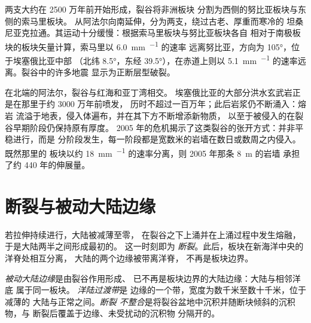 两支大约在 2500 万年前开始形成，裂谷将非洲板块
分割为西侧的努比亚板块与东侧的索马里板块。
从阿法尔向南延伸，分为两支，绕过古老、厚重而寒冷的
坦桑尼亚克拉通。其运动十分缓慢：根据索马里板块与努比亚板块各自
相对于南极板块的板块矢量计算，索马里以 \qty{6.0}{mm.^{-1}} 的速率
远离努比亚，方向为 \ang{105}，位于埃塞俄比亚中部
（北纬 \ang{8.5}，东经 \ang{39.5}），在赤道上则以
\qty{5.1}{mm.^{-1}} 的速率远离。裂谷中的许多地震
显示为正断层型破裂。

在北端的阿法尔，裂谷与红海和亚丁湾相交。
埃塞俄比亚的大部分洪水玄武岩正是在那里于约 3000 万年前喷发，
历时不超过一百万年；此后岩浆仍不断涌入：熔岩
流溢于地表，侵入体遍布，并在其下方不断增添新物质，
以至于被侵入的在裂谷早期阶段仍保持原有厚度。
2005 年的危机揭示了这类裂谷的张开方式：并非平稳进行，而是
分阶段发生，每一阶段都是宽数米的岩墙在数日或数周之内侵入。既然那里的
板块以约 \qty{18}{mm.^{-1}} 的速率分离，则 2005 年那条 \qty{8}{m} 的岩墙
承担了约 440 年的伸展量。

\section{断裂与被动大陆边缘}

若拉伸持续进行，大陆被减薄至零，
在裂谷之下上涌并在上涌过程中发生熔融，于是大陆两半之间形成最初的。
这一时刻即为
\emph{断裂}。此后，板块在新海洋中央的洋脊处相互分离，
大陆的两个边缘被带离洋脊，
不再是板块边界。

\begin{definition}\label{def:b1:rifts-ridges-margins:passive-margin}
\emph{被动大陆边缘}是由裂谷作用形成、
已不再是板块边界的大陆边缘：大陆与相邻洋底
属于同一板块。
\emph{洋陆过渡带}是
边缘的一个带，宽度为数千米至数十千米，位于减薄的
大陆与正常之间。\emph{断裂
不整合}是将裂谷盆地中沉积并随断块倾斜的沉积物，与
断裂后覆盖于边缘、未受扰动的沉积物
分隔开的。
\end{definition}

